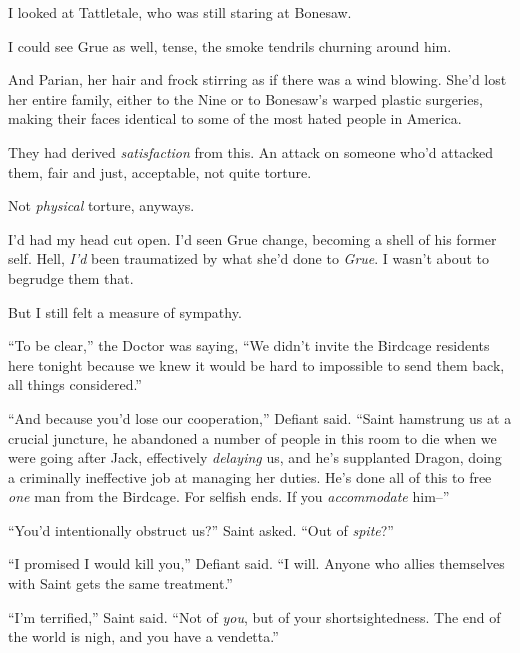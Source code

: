 I looked at Tattletale, who was still staring at Bonesaw.



I could see Grue as well, tense, the smoke tendrils churning around him.



And Parian, her hair and frock stirring as if there was a wind blowing.  She'd lost her entire family, either to the Nine or to Bonesaw's warped plastic surgeries, making their faces identical to some of the most hated people in America.



They had derived \emph{satisfaction} from this.  An attack on someone who'd attacked them, fair and just, acceptable, not quite torture.



Not \emph{physical} torture, anyways.



I'd had my head cut open.  I'd seen Grue change, becoming a shell of his former self.  Hell, \emph{I'd} been traumatized by what she'd done to \emph{Grue}.  I wasn't about to begrudge them that.



But I still felt a measure of sympathy.



``To be clear,'' the Doctor was saying, ``We didn't invite the Birdcage residents here tonight because we knew it would be hard to impossible to send them back, all things considered.''



``And because you'd lose our cooperation,'' Defiant said.  ``Saint hamstrung us at a crucial juncture, he abandoned a number of people in this room to die when we were going after Jack, effectively \emph{delaying} us, and he's supplanted Dragon, doing a criminally ineffective job at managing her duties.  He's done all of this to free \emph{one} man from the Birdcage.  For selfish ends.  If you \emph{accommodate} him--''



``You'd intentionally obstruct us?'' Saint asked.  ``Out of \emph{spite}?''



``I promised I would kill you,'' Defiant said.  ``I will.  Anyone who allies themselves with Saint gets the same treatment.''



``I'm terrified,'' Saint said.  ``Not of \emph{you}, but of your shortsightedness.  The end of the world is nigh, and you have a vendetta.''



